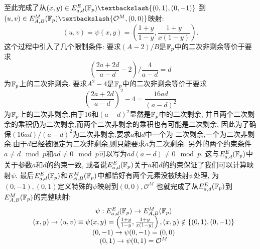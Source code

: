 至此完成了从$(x,y) \in E_{a,d}^E(\F_p) \textbackslash \{(0,1), (0,-1)\}$
到$(u,v) \in E_{A,B}^M(\F_p) \textbackslash \{\mathcal{O}^M, (0,0)\}$映射:
$$(u,v) = \psi(x,y) = \left( \frac{1+y}{1-y}, \frac{1+y}{x(1-y)} \right).$$
这个过程中引入了几个限制条件: 
要求$(A -2)/B$是$\mathbb{F}_p$中的二次非剩余等价于要求
$$
\left(\frac{2a+2d}{a-d} - 2\right) / \frac{4}{a-d} = d
$$
为$\mathbb{F}_p$上的二次非剩余.
要求$A^2-4$是$\mathbb{F}_p$中的二次非剩余等价于要求
$$
\left(\frac{2a+2d}{a-d}\right)^2 - 4 = \frac{16ad}{(a-d)^2}
$$
为$\mathbb{F}_p$上的二次非剩余.由于16和$(a-d)^2$显然是$\mathbb{F}_p$中的二次剩余,
并且两个二次剩余的乘积仍为二次剩余,而两个二次非剩余的乘积也有可能是二次剩余,
因此为了确保$(16ad)/(a-d)^2$为二次非剩余,要求$a$和$d$中一个为
二次剩余,一个为二次非剩余.由于$d$已经被限定为二次非剩余,则只能要求$a$为二次剩余.
另外的两个约束条件$a\neq d\mod p$和$ad\neq 0\mod p$可以写为$ad(a-d)\neq 0\mod p$.
这与$E_{a,d}^E(\mathbb{F}_p)$中关于参数$a$和$d$的约束一致,
或者说$E_{a,d}^E(\mathbb{F}_p)$关于$a$和$d$的约束保证了我们可以计算映射$\psi$.
最后$E_{a,d}^E(\mathbb{F}_p)$和$E_{A,B}^M(\mathbb{F}_p)$中都恰好有两个元素没被映射$\psi$处理,
为$(0,-1), (0,1)$定义特殊的$\psi$映射到$(0,0), \mathcal{O}^M$
也就完成了从$E_{a,d}^E(\mathbb{F}_p)$到$E_{A,B}^M(\mathbb{F}_p)$的完整映射:
\begin{equation*}
\begin{array}{cc}
& \psi:  E_{a,d}^E(\mathbb{F}_p) \rightarrow E_{A,B}^M(\mathbb{F}_p) \\
& (x,y) \rightarrow (u,v) \equiv \psi(x,y) = \left(\frac{1+y}{1-y}, \frac{1+y}{x(1-y)}\right), (x,y)\notin \{(0,1),(0,-1)\}\\
& (0,-1) \rightarrow \psi(0, -1) = (0,0) \\
& (0, 1) \rightarrow \psi(0,1) = \mathcal{O}^M
\end{array}
\end{equation*}

